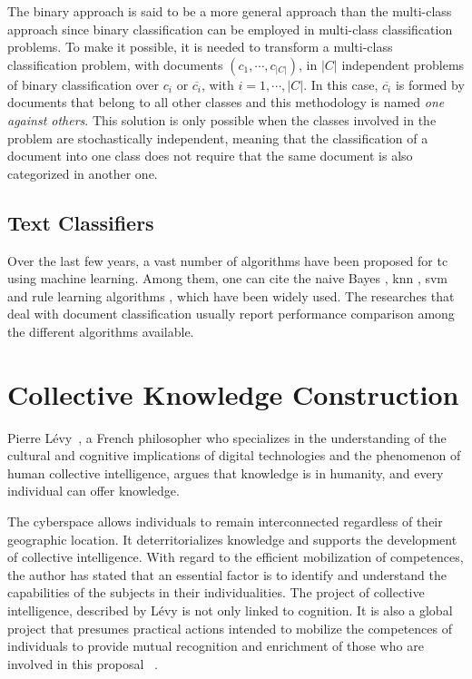 The binary approach is said to be a more general approach than the multi-class approach since binary classification can be employed in multi-class classification problems.  To make it possible, it is needed to transform a multi-class classification problem, with documents $(c_1, \cdots, c_{ |C|})$, in $|C|$ independent problems of binary classification over $c_i$ or $\overline{c_i}$, with $i=1,\cdots,|C|$. In this case, $\overline{c_i}$ is formed by documents that belong to all other classes and this methodology is named \textit{one against others}. This solution is only possible when the classes involved in the problem are stochastically independent, meaning that the classification of a document into one class does not require that the same document is also categorized in another one.


\subsection{\hspace*{3pt}Text Classifiers}
\label{sec:text-classifiers}

Over the last few years, a vast number of algorithms have been proposed for \gls{tc} using machine learning. Among them, one can cite the naive Bayes \cite{mccallum1998comparison}, \gls{knn} \cite{Rijsbergen:1979}, \gls{svm} \cite{joachims1998text} and rule learning algorithms \cite{slattery1998combining}, which have been widely used. The researches that deal with document classification usually report performance comparison among the different algorithms available.




\section{\hspace*{3pt} Collective Knowledge Construction}

Pierre Lévy~\cite{levy1997collective}, a French philosopher who specializes in the understanding of the cultural and cognitive implications of digital technologies and the phenomenon of human collective intelligence, argues that knowledge is in humanity, and every individual can offer knowledge.

The cyberspace allows individuals to remain interconnected regardless of their geographic location. It deterritorializes knowledge and supports the development of collective intelligence. With regard to the efficient mobilization of competences, the author has stated that an essential factor is to identify and understand the capabilities of the subjects in their individualities. The project of collective intelligence, described by Lévy is not only linked to cognition.  It is also a global project that presumes practical actions intended to mobilize the competences of individuals to provide mutual recognition and enrichment of those who are involved in this proposal ~\cite{levy1997collective}.

